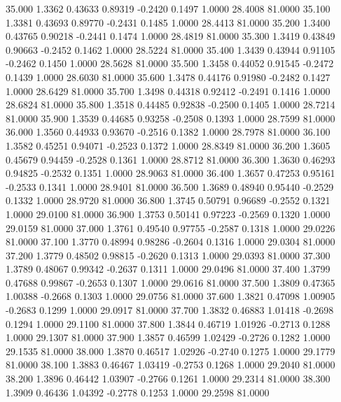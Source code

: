  35.000   1.3362   0.43633   0.89319  -0.2420   0.1497   1.0000  28.4008  81.0000
  35.100   1.3381   0.43693   0.89770  -0.2431   0.1485   1.0000  28.4413  81.0000
  35.200   1.3400   0.43765   0.90218  -0.2441   0.1474   1.0000  28.4819  81.0000
  35.300   1.3419   0.43849   0.90663  -0.2452   0.1462   1.0000  28.5224  81.0000
  35.400   1.3439   0.43944   0.91105  -0.2462   0.1450   1.0000  28.5628  81.0000
  35.500   1.3458   0.44052   0.91545  -0.2472   0.1439   1.0000  28.6030  81.0000
  35.600   1.3478   0.44176   0.91980  -0.2482   0.1427   1.0000  28.6429  81.0000
  35.700   1.3498   0.44318   0.92412  -0.2491   0.1416   1.0000  28.6824  81.0000
  35.800   1.3518   0.44485   0.92838  -0.2500   0.1405   1.0000  28.7214  81.0000
  35.900   1.3539   0.44685   0.93258  -0.2508   0.1393   1.0000  28.7599  81.0000
  36.000   1.3560   0.44933   0.93670  -0.2516   0.1382   1.0000  28.7978  81.0000
  36.100   1.3582   0.45251   0.94071  -0.2523   0.1372   1.0000  28.8349  81.0000
  36.200   1.3605   0.45679   0.94459  -0.2528   0.1361   1.0000  28.8712  81.0000
  36.300   1.3630   0.46293   0.94825  -0.2532   0.1351   1.0000  28.9063  81.0000
  36.400   1.3657   0.47253   0.95161  -0.2533   0.1341   1.0000  28.9401  81.0000
  36.500   1.3689   0.48940   0.95440  -0.2529   0.1332   1.0000  28.9720  81.0000
  36.800   1.3745   0.50791   0.96689  -0.2552   0.1321   1.0000  29.0100  81.0000
  36.900   1.3753   0.50141   0.97223  -0.2569   0.1320   1.0000  29.0159  81.0000
  37.000   1.3761   0.49540   0.97755  -0.2587   0.1318   1.0000  29.0226  81.0000
  37.100   1.3770   0.48994   0.98286  -0.2604   0.1316   1.0000  29.0304  81.0000
  37.200   1.3779   0.48502   0.98815  -0.2620   0.1313   1.0000  29.0393  81.0000
  37.300   1.3789   0.48067   0.99342  -0.2637   0.1311   1.0000  29.0496  81.0000
  37.400   1.3799   0.47688   0.99867  -0.2653   0.1307   1.0000  29.0616  81.0000
  37.500   1.3809   0.47365   1.00388  -0.2668   0.1303   1.0000  29.0756  81.0000
  37.600   1.3821   0.47098   1.00905  -0.2683   0.1299   1.0000  29.0917  81.0000
  37.700   1.3832   0.46883   1.01418  -0.2698   0.1294   1.0000  29.1100  81.0000
  37.800   1.3844   0.46719   1.01926  -0.2713   0.1288   1.0000  29.1307  81.0000
  37.900   1.3857   0.46599   1.02429  -0.2726   0.1282   1.0000  29.1535  81.0000
  38.000   1.3870   0.46517   1.02926  -0.2740   0.1275   1.0000  29.1779  81.0000
  38.100   1.3883   0.46467   1.03419  -0.2753   0.1268   1.0000  29.2040  81.0000
  38.200   1.3896   0.46442   1.03907  -0.2766   0.1261   1.0000  29.2314  81.0000
  38.300   1.3909   0.46436   1.04392  -0.2778   0.1253   1.0000  29.2598  81.0000

